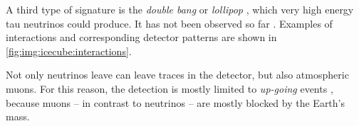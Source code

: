 %
A third type of signature is the
    \emph{double bang} \cite{kowalski2017}
    or \emph{lollipop} \cite{neutrinos_beacom},
  which very high energy tau neutrinos could produce.
It has not been observed so far \cite{neutrinos_aartsen_tau}.
%
Examples of interactions and corresponding detector patterns are shown in \autoref{fig:img:icecube:interactions}.

 \label{sec:neutrino_astronomy:icecube:up_going}
Not only neutrinos leave can leave traces in the detector, %
  but also atmospheric muons.
For this reason,
  the detection is mostly limited to \emph{up-going} events \cite{icecube_aartsen},
    because muons
      – in contrast to neutrinos –
    are mostly blocked by the Earth's mass.


